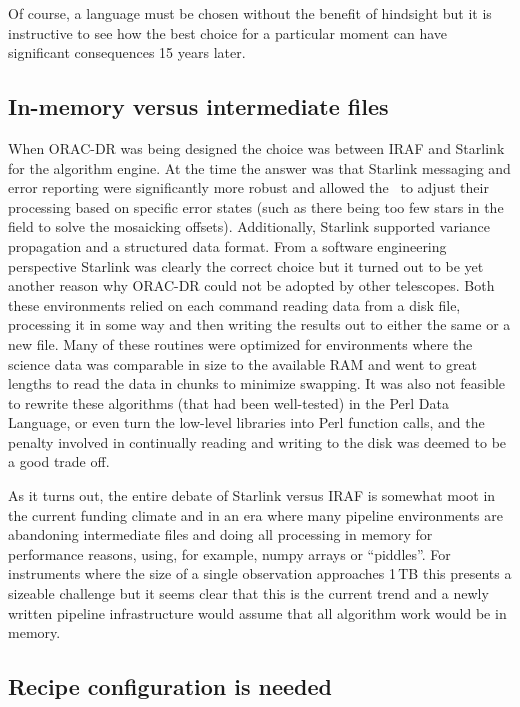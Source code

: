 \documentclass[final,authoryear,5p,times,twocolumn]{elsarticle}
\begin{document}
Of course, a language must be chosen without the benefit of hindsight
but it is instructive to see how the best choice for a particular
moment can have significant consequences 15 years later.

\subsection{In-memory versus intermediate files}

When ORAC-DR was being designed the choice was between IRAF
\citep[][]{2012ASPC..461..595F} and Starlink for the algorithm engine.
At the time the answer was that Starlink messaging and error reporting were
significantly more robust and allowed the \primitives\ to adjust their
processing based on specific error states (such as there being too few
stars in the field to solve the mosaicking offsets). Additionally,
Starlink supported variance propagation and a structured data format.
From a software
engineering perspective Starlink was clearly the correct choice but it
turned out to be yet another reason why ORAC-DR could not be adopted
by other telescopes. Both these environments relied on each command
reading data from a disk file, processing it in some way and then
writing the results out to either the same or a new file. Many of
these routines were optimized for environments where the science data
was comparable in size to the available RAM and went to great lengths
to read the data in chunks to minimize swapping. It was also not
feasible to rewrite these algorithms (that had been well-tested) in
the Perl Data Language, or even turn the low-level libraries into Perl
function calls, and the penalty involved in continually reading
and writing to the disk was deemed to be a good trade off.

As it turns out, the entire debate of Starlink versus IRAF is somewhat
moot in the current funding climate and in an era where many pipeline
environments \citep[e.g.,][]{2010SPIE.7740E..15A} are abandoning
intermediate files and doing all processing in memory for performance
reasons, using, for example, numpy arrays or ``piddles''. For
instruments where the size of a single observation approaches 1\,TB
\citep[e.g., SWCam at CCAT;][]{2014SPIE9153-21} this presents a
sizeable challenge but it seems clear that this is the current trend
and a newly written pipeline infrastructure would assume that all
algorithm work would be in memory.

\subsection{Recipe configuration is needed}
\end{document}
